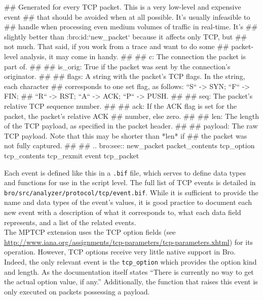 \begin{code}[frame = single]
## Generated for every TCP packet. This is a very low-level and expensive event
## that should be avoided when at all possible. It's usually infeasible to
## handle when processing even medium volumes of traffic in real-time.  It's
## slightly better than :bro:id:`new_packet` because it affects only TCP, but
## not much. That said, if you work from a trace and want to do some
## packet-level analysis, it may come in handy.
##
## c: The connection the packet is part of.
##
## is_orig: True if the packet was sent by the connection's originator.
##
## flags: A string with the packet's TCP flags. In the string, each character
##        corresponds to one set flag, as follows: ``S`` -> SYN; ``F`` -> FIN;
##        ``R`` -> RST; ``A`` -> ACK; ``P`` -> PUSH.
##
## seq: The packet's relative TCP sequence number.
##
## ack: If the ACK flag is set for the packet, the packet's relative ACK
##      number, else zero.
##
## len: The length of the TCP payload, as specified in the packet header.
##
## payload: The raw TCP payload. Note that this may be shorter than *len* if
##          the packet was not fully captured.
##
## .. bro:see:: new_packet packet_contents tcp_option tcp_contents tcp_rexmit
event tcp_packet%
\end{code}

Each event is defined like this in a \texttt{.bif} file, which serves to define data types and functions for use in the script level. The full list of TCP events is detailed in \\ \texttt{bro/src/analyzer/protocol/tcp/event.bif}. While it is sufficient to provide the name and data types of the event's values, it is good practice to document each new event with a description of what it corresponds to, what each data field represents, and a list of the related events. \\

The MPTCP extension uses the TCP option fields (see \url{http://www.iana.org/assignments/tcp-parameters/tcp-parameters.xhtml}) for its operation. However, TCP options receive very little native support in Bro. Indeed, the only relevant event is the \texttt{tcp\_option} which provides the option kind and length. As the documentation itself states ``There is currently no way to get the actual option value, if any.''  Additionally, the function that raises this event is only executed on packets possessing a payload.\\ 

